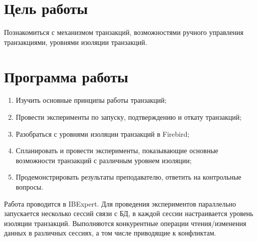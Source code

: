 \section{Цель работы}

Познакомиться с механизмом транзакций, возможностями ручного управления транзакциями, уровнями изоляции транзакций.

\section{Программа работы}

\begin{enumerate}
	\item Изучить основные принципы работы транзакций;
	\item Провести эксперименты по запуску, подтверждению и откату транзакций;
	\item Разобраться с уровнями изоляции транзакций в Firebird;
	\item Спланировать и провести эксперименты, показывающие основные возможности транзакций с различным уровнем изоляции;
	\item Продемонстрировать результаты преподавателю, ответить на контрольные вопросы.
\end{enumerate}

Работа проводится в IBExpert. Для проведения экспериментов параллельно запускается несколько сессий связи с БД, в каждой сессии настраивается уровень изоляции транзакций. Выполняются конкурентные операции чтения/изменения данных в различных сессиях, а том числе приводящие к конфликтам.